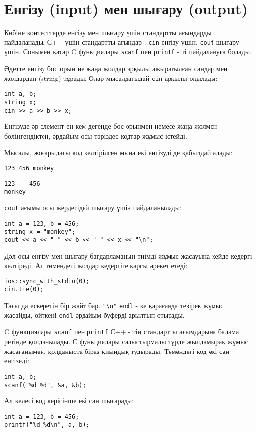 \section{Енгізу (input) мен шығару (output)}


Көбіне контесттерде енгізу мен шығару үшін 
стандартты ағындарды пайдаланады.
С++ үшін стандартты ағындар :
\texttt{cin} енгізу үшін, \texttt{cout} шығару үшін.
Сонымен қатар C функциялары
\texttt{scanf} пен \texttt{printf} - ті пайдалануға болады.

Әдетте енгізу бос орын не жаңа жолдар арқылы ажыратылған сандар мен жолдардан (string) тұрады.
Олар мысалдағыдай \texttt{cin} арқылы оқылады:

\begin{lstlisting}
int a, b;
string x;
cin >> a >> b >> x;
\end{lstlisting}

Енгізуде әр элемент ең кем дегенде бос 
орынмен немесе жаңа жолмен бөлінгендіктен, әрдайым осы тәріздес кодтар жұмыс істейді.

Мысалы, жоғарыдағы код келтірілген мына екі енгізуді де қабылдай алады:
\begin{lstlisting}
123 456 monkey
\end{lstlisting}
\begin{lstlisting}
123    456
monkey
\end{lstlisting}
\texttt{cout} ағымы осы жердегідей шығару үшін пайдаланылады:
\begin{lstlisting}
int a = 123, b = 456;
string x = "monkey";
cout << a << " " << b << " " << x << "\n";
\end{lstlisting}

Дәл осы енгізу мен шығару бағдарламаның тиімді жұмыс жасауына кейде кедергі келтіреді.
Ал төмендегі жолдар кедергіге қарсы әрекет етеді:

\begin{lstlisting}
ios::sync_with_stdio(0);
cin.tie(0);
\end{lstlisting}

Тағы да ескеретін бір жайт бар. \texttt{"\textbackslash n"}
\texttt{endl} - ке қарағанда тезірек жұмыс жасайды,
өйткені \texttt{endl} әрдайым буферді арылтып отырады.

C функциялары \texttt{scanf}
пен \texttt{printf} С++ - тің стандартты ағымдарына балама ретінде қолданылады.
С функциялары салыстырмалы түрде жылдамырақ жұмыс жасағанымен, қолданыста біраз қиындық тудырады.
Төмендегі код екі сан енгізеді:
\begin{lstlisting}
int a, b;
scanf("%d %d", &a, &b);
\end{lstlisting}
Ал келесі код керісінше екі сан шығарады:
\begin{lstlisting}
int a = 123, b = 456;
printf("%d %d\n", a, b);
\end{lstlisting}

